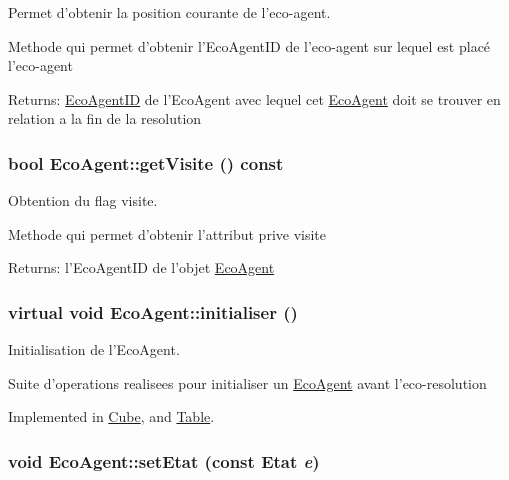 Permet d'obtenir la position courante de l'eco-agent. 

Methode qui permet d'obtenir l'EcoAgentID de l'eco-agent sur lequel est placé l'eco-agent

\begin{Desc}
\item[Returns:]\hyperlink{classEcoAgentID}{EcoAgentID} de l'EcoAgent avec lequel cet \hyperlink{classEcoAgent}{EcoAgent} doit se trouver en relation a la fin de la resolution \end{Desc}
\hypertarget{classEcoAgent_8156bc22f2daca635c4f2577e6b96849}{
\subsubsection[{getVisite}]{\setlength{\rightskip}{0pt plus 5cm}bool EcoAgent::getVisite () const}}
\label{classEcoAgent_8156bc22f2daca635c4f2577e6b96849}


Obtention du flag visite. 

Methode qui permet d'obtenir l'attribut prive visite

\begin{Desc}
\item[Returns:]l'EcoAgentID de l'objet \hyperlink{classEcoAgent}{EcoAgent} \end{Desc}
\hypertarget{classEcoAgent_f779fd214bed010d0f6b7b137fde7116}{
\subsubsection[{initialiser}]{\setlength{\rightskip}{0pt plus 5cm}virtual void EcoAgent::initialiser ()}}
\label{classEcoAgent_f779fd214bed010d0f6b7b137fde7116}


Initialisation de l'EcoAgent. 

Suite d'operations realisees pour initialiser un \hyperlink{classEcoAgent}{EcoAgent} avant l'eco-resolution 

Implemented in \hyperlink{classCube_6687c2575f4ce927f6b3032fb46040eb}{Cube}, and \hyperlink{classTable_964952b5f899c8abb64e9622a8457466}{Table}.\hypertarget{classEcoAgent_e06a7430bd88705a327cf498c8420a2b}{
\subsubsection[{setEtat}]{\setlength{\rightskip}{0pt plus 5cm}void EcoAgent::setEtat (const {\bf Etat} {\em e})}}
\label{classEcoAgent_e06a7430bd88705a327cf498c8420a2b}


